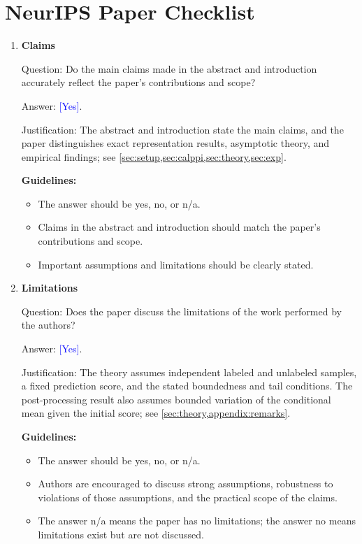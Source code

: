 \documentclass{article}
\theoremstyle{plain}
\theoremstyle{definition}
\newcommand{\1}{\mathbf{1}}
\providecommand{\answerYes}[1][]{\textcolor{blue}{[Yes]#1}}
\begin{document}
\clearpage

\section*{NeurIPS Paper Checklist}

\begin{enumerate}[leftmargin=5mm]
\item \textbf{Claims}

Question: Do the main claims made in the abstract and introduction accurately
reflect the paper's contributions and scope?

Answer: \answerYes{}.

Justification: The abstract and introduction state the main claims, and the
paper distinguishes exact representation results, asymptotic theory, and
empirical findings; see \cref{sec:setup,sec:calppi,sec:theory,sec:exp}.

\textbf{Guidelines:}
\begin{itemize}[leftmargin=5mm, noitemsep]
\item The answer should be yes, no, or n/a.
\item Claims in the abstract and introduction should match the paper's
contributions and scope.
\item Important assumptions and limitations should be clearly stated.
\end{itemize}

\item \textbf{Limitations}

Question: Does the paper discuss the limitations of the work performed by the
authors?

Answer: \answerYes{}.

Justification: The theory assumes independent labeled and unlabeled samples,
a fixed prediction score, and the stated boundedness and tail conditions.
The post-processing result also assumes bounded variation of the conditional
mean given the initial score; see \cref{sec:theory,appendix:remarks}.

\textbf{Guidelines:}
\begin{itemize}[leftmargin=5mm, noitemsep]
\item The answer should be yes, no, or n/a.
\item Authors are encouraged to discuss strong assumptions, robustness to
violations of those assumptions, and the practical scope of the claims.
\item The answer n/a means the paper has no limitations; the answer no means
limitations exist but are not discussed.
\end{itemize}


\end{enumerate}
\end{document}
